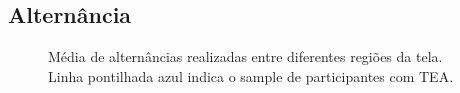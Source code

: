 \documentclass{article}
\begin{document}
\subsection{Alternância}

\begin{figure}[H]
  \caption{Média de alternâncias realizadas entre diferentes regiões da tela. Linha pontilhada azul indica o sample de participantes com TEA.}
  \noindent{}
  \centering
\end{figure}
\end{document}
